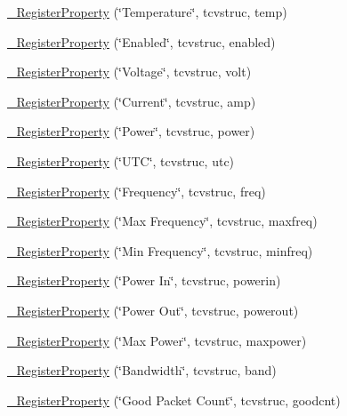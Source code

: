 \begin{DoxyCompactItemize}
\item 
\hyperlink{namespacecubesat_ad9e52a0ce2c3bc006a68a7a2ee6fc098}{\+\_\+\+Register\+Property} (\char`\"{}Temperature\char`\"{}, tcvstruc, temp)
\item 
\hyperlink{namespacecubesat_a81387d891db58db5835ab1bee5c3616d}{\+\_\+\+Register\+Property} (\char`\"{}Enabled\char`\"{}, tcvstruc, enabled)
\item 
\hyperlink{namespacecubesat_a7c2eb31e717e2a6562b5cf4ab26c9870}{\+\_\+\+Register\+Property} (\char`\"{}Voltage\char`\"{}, tcvstruc, volt)
\item 
\hyperlink{namespacecubesat_a07c1968eadc068db782155d93d62863e}{\+\_\+\+Register\+Property} (\char`\"{}Current\char`\"{}, tcvstruc, amp)
\item 
\hyperlink{namespacecubesat_ad98f3a637f65fa42645a2ab3a47848cb}{\+\_\+\+Register\+Property} (\char`\"{}Power\char`\"{}, tcvstruc, power)
\item 
\hyperlink{namespacecubesat_a738576c2c7c6ae926fe78dd3a5ef4b03}{\+\_\+\+Register\+Property} (\char`\"{}U\+TC\char`\"{}, tcvstruc, utc)
\item 
\hyperlink{namespacecubesat_adf2b02e8338ce448dd6824f0f55bd43d}{\+\_\+\+Register\+Property} (\char`\"{}Frequency\char`\"{}, tcvstruc, freq)
\item 
\hyperlink{namespacecubesat_a9cd182663ced5c63d086360eb0cbbe41}{\+\_\+\+Register\+Property} (\char`\"{}Max Frequency\char`\"{}, tcvstruc, maxfreq)
\item 
\hyperlink{namespacecubesat_a8c44383989fad18490e66a66cb810996}{\+\_\+\+Register\+Property} (\char`\"{}Min Frequency\char`\"{}, tcvstruc, minfreq)
\item 
\hyperlink{namespacecubesat_a27b5c904bcdc5725913141037ebfe4ff}{\+\_\+\+Register\+Property} (\char`\"{}Power In\char`\"{}, tcvstruc, powerin)
\item 
\hyperlink{namespacecubesat_a74f354677edb168867b1ec01d41ddceb}{\+\_\+\+Register\+Property} (\char`\"{}Power Out\char`\"{}, tcvstruc, powerout)
\item 
\hyperlink{namespacecubesat_a21b46b24747cede24591a4fa09938d46}{\+\_\+\+Register\+Property} (\char`\"{}Max Power\char`\"{}, tcvstruc, maxpower)
\item 
\hyperlink{namespacecubesat_a016d2f8569dd1a4e8d991a8be018ad5e}{\+\_\+\+Register\+Property} (\char`\"{}Bandwidth\char`\"{}, tcvstruc, band)
\item 
\hyperlink{namespacecubesat_ad8e29ac7bcd0db763374743ea254efe1}{\+\_\+\+Register\+Property} (\char`\"{}Good Packet Count\char`\"{}, tcvstruc, goodcnt)

\end{DoxyCompactItemize}
